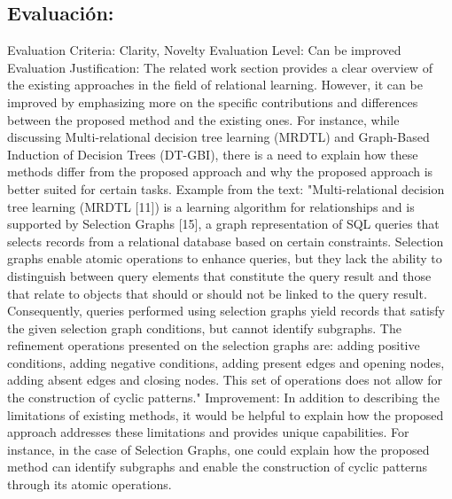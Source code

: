 \documentclass{article}%
\begin{document}
%
\subsection{Evaluación:}%
\label{subsec:Evaluacin}%
Evaluation Criteria: Clarity, Novelty\newline%
\newline%
Evaluation Level: Can be improved\newline%
\newline%
Evaluation Justification: The related work section provides a clear overview of the existing approaches in the field of relational learning. However, it can be improved by emphasizing more on the specific contributions and differences between the proposed method and the existing ones. For instance, while discussing Multi{-}relational decision tree learning (MRDTL) and Graph{-}Based Induction of Decision Trees (DT{-}GBI), there is a need to explain how these methods differ from the proposed approach and why the proposed approach is better suited for certain tasks.\newline%
\newline%
Example from the text: "Multi{-}relational decision tree learning (MRDTL {[}11{]}) is a learning algorithm for relationships and is supported by Selection Graphs {[}15{]}, a graph representation of SQL queries that selects records from a relational database based on certain constraints. Selection graphs enable atomic operations to enhance queries, but they lack the ability to distinguish between query elements that constitute the query result and those that relate to objects that should or should not be linked to the query result. Consequently, queries performed using selection graphs yield records that satisfy the given selection graph conditions, but cannot identify subgraphs. The refinement operations presented on the selection graphs are: adding positive conditions, adding negative conditions, adding present edges and opening nodes, adding absent edges and closing nodes. This set of operations does not allow for the construction of cyclic patterns."\newline%
\newline%
Improvement: In addition to describing the limitations of existing methods, it would be helpful to explain how the proposed approach addresses these limitations and provides unique capabilities. For instance, in the case of Selection Graphs, one could explain how the proposed method can identify subgraphs and enable the construction of cyclic patterns through its atomic operations.
\end{document}
